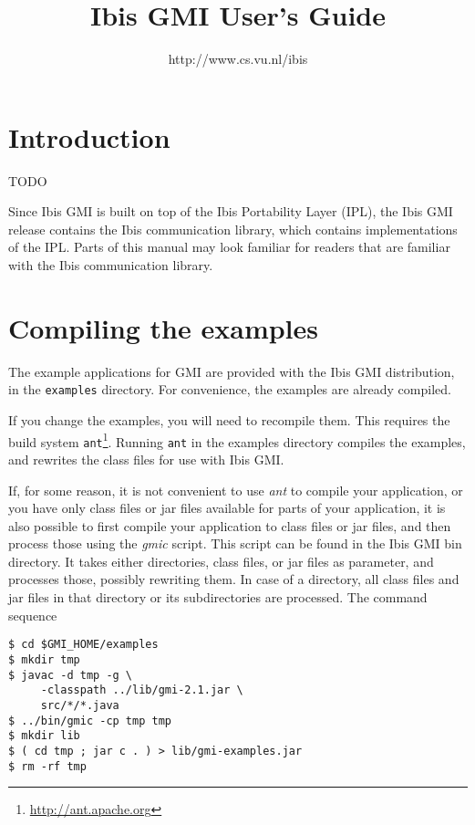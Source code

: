 \documentclass[a4paper,10pt]{article}
\begin{document}
\title{Ibis GMI User's Guide}

\author{http://www.cs.vu.nl/ibis}

\maketitle

\section{Introduction}

TODO

Since Ibis GMI is built on top of the Ibis Portability Layer (IPL),
the Ibis GMI release contains the Ibis communication library, which contains
implementations of the IPL. Parts of this manual may look familiar for
readers that are familiar with the Ibis communication library.

\section{Compiling the examples}

The example applications for GMI are
provided with the Ibis GMI distribution, in the \texttt{examples} directory.
For convenience, the examples are already compiled.

If you change the examples, you will need to recompile them. This
requires the build system \texttt{ant}\footnote{\url{http://ant.apache.org}}.
Running \texttt{ant} in the examples directory compiles the examples,
and rewrites the class files for use with Ibis GMI.

If, for some reason, it is not convenient to use \emph{ant} to compile
your application, or you have only class files or jar files available
for parts of your application, it is also possible to first compile
your application to class files or jar files, and then process those
using the \emph{gmic} script. This script can be found in the Ibis GMI
bin directory. It takes either directories, class files, or jar files
as parameter, and processes those, possibly rewriting them. In case
of a directory, all class files and jar files in that directory or
its subdirectories are processed.  The command sequence

\begin{verbatim}
$ cd $GMI_HOME/examples
$ mkdir tmp
$ javac -d tmp -g \
     -classpath ../lib/gmi-2.1.jar \
     src/*/*.java
$ ../bin/gmic -cp tmp tmp
$ mkdir lib
$ ( cd tmp ; jar c . ) > lib/gmi-examples.jar
$ rm -rf tmp
\end{verbatim}
\end{document}
